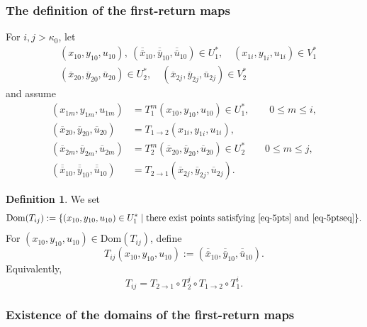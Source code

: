 \documentclass[11pt,a4paper]{article}
\theoremstyle{plain}
\theoremstyle{definition}
\newtheorem{definition}[theorem]{Definition}
\theoremstyle{plain}
\numberwithin{equation}{section}
\begin{document}
\subsubsection{The definition of the first-return maps}
For $i,j > \kappa_0$, let
\begin{equation}
\label{eq-5pts}
\begin{aligned}
&(x_{10},y_{10},u_{10}),\ (\overline{\overline{x}}_{10},\overline{\overline{y}}_{10},\overline{\overline{u}}_{10}) \in U_1^*, \quad (x_{1i},y_{1i},u_{1i}) \in V_1^* \\
&(\overline{x}_{20},\overline{y}_{20},\overline{u}_{20}) \in U_2^*, \quad (\overline{x}_{2j},\overline{y}_{2j},\overline{u}_{2j}) \in V_2^*
\end{aligned}
\end{equation}
and assume
\begin{equation}
\label{eq-5ptseq}
\begin{aligned}
(x_{1m},y_{1m},u_{1m})
&=
T_1^m(x_{10},y_{10},u_{10}) \in U_1^*, \qquad 0 \le m \le i, \\
(\overline{x}_{20},\overline{y}_{20},\overline{u}_{20})
&=
T_{1 \to 2}(x_{1i},y_{1i},u_{1i}), \\
(\overline{x}_{2m},\overline{y}_{2m},\overline{u}_{2m})
&=
T_2^m(\overline{x}_{20},\overline{y}_{20},\overline{u}_{20}) \in U_2^* \qquad 0 \le m \le j, \\
(\overline{\overline{x}}_{10},\overline{\overline{y}}_{10},\overline{\overline{u}}_{10})
&=
T_{2 \to 1}(\overline{x}_{2j},\overline{y}_{2j},\overline{u}_{2j}).
\end{aligned}
\end{equation}

\begin{definition}
We set
\[
\mathrm{Dom}(T_{ij})
:=
\{
(x_{10},y_{10},u_{10}) \in U_1^*
\mid
\text{there exist points satisfying \eqref{eq-5pts} and \eqref{eq-5ptseq}}
\}.
\]
For $(x_{10},y_{10},u_{10}) \in \mathrm{Dom}(T_{ij})$, define
\[
T_{ij}(x_{10},y_{10},u_{10})
:=
(\overline{\overline{x}}_{10},\overline{\overline{y}}_{10},\overline{\overline{u}}_{10}).
\]
Equivalently,
\[
T_{ij} = T_{2 \to 1} \circ T_2^j \circ T_{1 \to 2} \circ T_1^i.
\]
\end{definition}

\subsubsection{Existence of the domains of the first-return maps}
\label{sec-dom}
\end{document}
